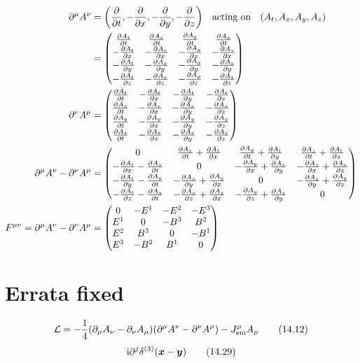\documentclass[letterpaper]{article}
\theoremstyle{definition}
\begin{document}
\begin{align*}
  \partial^\mu A^\nu                               & =\pqty{\pdv{t},-\pdv{x},-\pdv{y},-\pdv{z}}\qq{acting on}\pqty{A_t,A_x,A_y,A_z} \\
                                                   & =\begin{pmatrix}\pdv{A_t}{t} & \pdv{A_x}{t} & \pdv{A_y}{t} & \pdv{A_z}{t} \\-\pdv{A_t}{x} & -\pdv{A_x}{x} & -\pdv{A_y}{x} & -\pdv{A_z}{x} \\-\pdv{A_t}{y} & -\pdv{A_x}{y} & -\pdv{A_y}{y} & -\pdv{A_z}{y} \\-\pdv{A_t}{z} & -\pdv{A_x}{z} &- \pdv{A_y}{z} & -\pdv{A_z}{z}\end{pmatrix}                                                    \\
  \partial^\nu A^\mu                               & =\begin{pmatrix}\pdv{A_t}{t} & -\pdv{A_t}{x} & -\pdv{A_t}{y} & -\pdv{A_t}{z} \\\pdv{A_x}{t} & -\pdv{A_x}{x} & -\pdv{A_x}{y} & -\pdv{A_x}{z} \\\pdv{A_y}{t} & -\pdv{A_y}{x} & -\pdv{A_y}{y} & -\pdv{A_y}{z} \\\pdv{A_z}{t} & -\pdv{A_z}{x} &-\pdv{A_z}{y} & -\pdv{A_z}{z}\end{pmatrix}                                                    \\
  \partial^\mu A^\nu-\partial^\nu A^\mu            & =  \begin{pmatrix}0 & \pdv{A_x}{t}+\pdv{A_t}{x} & \pdv{A_y}{t}+\pdv{A_t}{y} & \pdv{A_z}{t}+\pdv{A_t}{z} \\-\pdv{A_t}{x}-\pdv{A_x}{t} & 0 & -\pdv{A_y}{x}+\pdv{A_x}{y} & -\pdv{A_z}{x}+\pdv{A_x}{z} \\-\pdv{A_t}{y}-\pdv{A_y}{t} & -\pdv{A_x}{y}+\pdv{A_y}{x} & 0 & -\pdv{A_z}{y}+\pdv{A_y}{z} \\-\pdv{A_t}{z}-\pdv{A_z}{t} & -\pdv{A_x}{z}+\pdv{A_z}{x} &- \pdv{A_y}{z}+\pdv{A_z}{y} & 0\end{pmatrix}                                                  \\
  F^{\mu\nu}=\partial^\mu A^\nu-\partial^\nu A^\mu & =\begin{pmatrix}0 & -E^1 & -E^2 & -E^3 \\E^1 & 0 & -B^3 & B^2 \\E^2 & B^3 & 0 & -B^1 \\E^3 & -B^2 &B^1 & 0  \end{pmatrix}                                                    \\
\end{align*}



\section*{Errata fixed}


\[\mathcal{L}=-\frac{1}{4}\pqty{\partial_\mu A_\nu-\partial_\nu A_\mu}\pqty{\partial^\mu A^\nu-\partial^\nu A^\mu}-J^\mu_{\text{em}}A_\mu \qquad(14.12)\]
\[\text{i}\partial^j\delta^{(3)}(\vb*{x}-\vb*{y}) \qquad(14.29)\]
\end{document}
